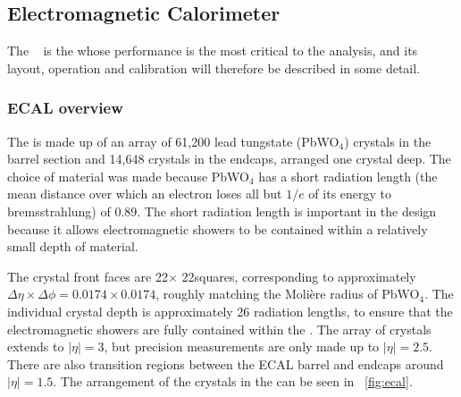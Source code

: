 \subsection{Electromagnetic Calorimeter}
\label{sec:cms:ecal}

The \ECAL~\cite{CMSTDR,CMSEcalTDR} is the \subdetector whose performance is the most critical to the \Hgg analysis, and its layout, operation and calibration will therefore be described in some detail. 

\subsubsection{ECAL overview}
\label{sec:cms:ecal:overview}

The \ECAL is made up of an array of 61,200 lead tungstate (PbWO$_4$) crystals in the barrel section and 14,648 crystals in the endcaps, arranged one crystal deep. The choice of material was made because PbWO$_4$ has a short radiation length (the mean distance over which an electron loses all but $1/e$ of its energy to bremsstrahlung) of 0.89\cm. The short radiation length is important in the \ECAL design because it allows electromagnetic showers to be contained within a relatively small depth of material. 

The \ECAL crystal front faces are 22\mm $\times$ 22\mm squares, corresponding to approximately $\Delta \eta \times \Delta \phi = 0.0174 \times 0.0174$, roughly matching the Moli\`ere radius of PbWO$_4$. The individual crystal depth is approximately 26 radiation lengths, to ensure that the electromagnetic showers are fully contained within the \ECAL. The array of crystals extends to $|\eta| = 3$, but precision measurements are only made up to $|\eta| =2.5$. There are also transition regions between the ECAL barrel and endcaps around $|\eta| = 1.5$. The arrangement of the crystals in the \ECAL can be seen in \Fig~\ref{fig:ecal}.

